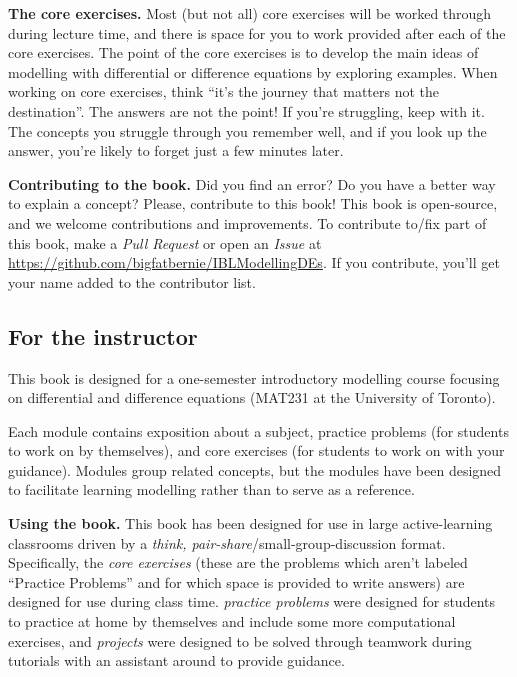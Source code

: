 {\bf The core exercises.} Most (but not all) core exercises will be
worked through during lecture time, and there is space for you to work
provided after each of the core exercises. 
The point of the core exercises is to develop the main ideas of modelling with differential or difference equations by exploring examples. When working on core exercises, think ``it's the journey that matters not the destination''. The answers are not the point! If you're struggling, keep with it. The concepts you struggle through you remember well, and if you look up the answer, you're likely to forget just a few minutes later. 


{\bf Contributing to the book.} Did you find an error? Do you
have a better way to explain a concept? Please,
contribute to this book!  This book is open-source, and we welcome
contributions and improvements. To contribute to/fix part of
this book, make a \emph{Pull Request} or open an \emph{Issue} at
\url{https://github.com/bigfatbernie/IBLModellingDEs}. If you contribute,
you'll get your name added to the contributor list.


\subsection*{For the instructor}

This book is designed for a one-semester introductory modelling course focusing on differential and difference equations (MAT231 at the University of Toronto). 


Each module contains exposition about a subject, practice problems (for students to work on by themselves), and core exercises (for students to work on with your guidance). Modules group related concepts, but the modules have been designed to facilitate learning modelling rather than to serve as a reference. 

{\bf Using the book.} This book has been designed for use in large 
active-learning classrooms driven by a \emph{think, pair-share}/small-group-discussion format.
Specifically, the \emph{core exercises} (these are the problems which aren't labeled ``Practice Problems'' and for which space is provided to write answers) are designed for use during class time. \emph{practice problems} were designed for students to practice at home by themselves and include some more computational exercises, and \emph{projects} were designed to be solved through teamwork during tutorials with an assistant around to provide guidance.

